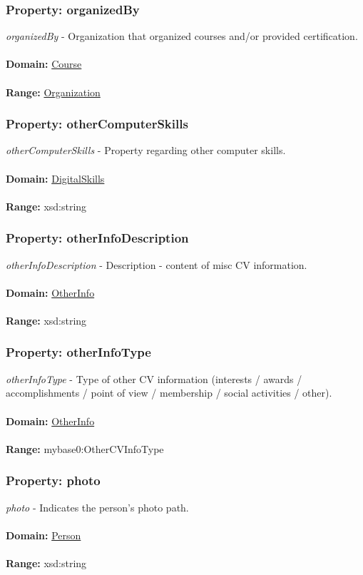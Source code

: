 \documentclass[a4paper,12pt]{article}
\numberwithin{equation}{section}
\begin{document}
\subsubsection{Property: organizedBy}\hypertarget{organizedBy}{}
\textit{organizedBy} - Organization that organized courses and/or provided certification.
\\\\
\textbf{Domain:} \hyperlink{Course}{Course} 
\\\\
\textbf{Range:}  \hyperlink{Organization}{Organization} 

\subsubsection{Property: otherComputerSkills}\hypertarget{otherComputerSkills}{}
\textit{otherComputerSkills} - Property regarding other computer skills.
\\\\
\textbf{Domain:} \hyperlink{DigitalSkills}{DigitalSkills} 
\\\\
\textbf{Range:}  xsd:string

\subsubsection{Property: otherInfoDescription}\hypertarget{otherInfoDescription}{}
\textit{otherInfoDescription} - Description - content of misc CV information.
\\\\
\textbf{Domain:} \hyperlink{OtherInfo}{OtherInfo} 
\\\\
\textbf{Range:}  xsd:string

\subsubsection{Property: otherInfoType}\hypertarget{otherInfoType}{}
\textit{otherInfoType} - Type of other CV information (interests / awards / accomplishments / point of view / membership / social activities / other).
\\\\
\textbf{Domain:} \hyperlink{OtherInfo}{OtherInfo} 
\\\\
\textbf{Range:}  mybase0:OtherCVInfoType

\subsubsection{Property: photo}\hypertarget{photo}{}
\textit{photo} - Indicates the person's photo path.
\\\\
\textbf{Domain:} \hyperlink{Person}{Person} 
\\\\
\textbf{Range:}  xsd:string
\end{document}
